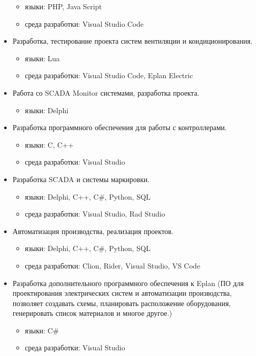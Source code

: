 \begin{itemize}
\begin{itemize}
       \item языки: PHP, Java Script
       \item среда разработки: Visual Studio Code
   \end{itemize}
   \item Разработка, тестирование проекта систем вентиляции и кондиционирования.
   \begin{itemize}
       \item языки: Lua
       \item среда разработки: Visual Studio Code, Eplan Electric
   \end{itemize}
   \item Работа со SCADA Monitor системами, разработка проекта.
   \begin{itemize}
       \item языки: Delphi
   \end{itemize}
   \item Разработка программного обеспечения для работы с контроллерами.
   \begin{itemize}
       \item языки: C, C++
       \item среда разработки: Visual Studio
   \end{itemize}
   \item Разработка SCADA и системы маркировки.
   \begin{itemize}
       \item языки: Delphi, C++, C#, Python, SQL
       \item среда разработки: Visual Studio, Rad Studio
   \end{itemize}
   \item Автоматизация производства, реализация проектов.
   \begin{itemize}
      \item языки: Delphi, C++, C#, Python, SQL
      \item среда разработки: Clion, Rider, Visual Studio, VS Code
  \end{itemize}
  \item  Разработка дополнительного программного обеспечения к Eplan (ПО для проектирования электрических систем и автоматизации производства, позволяет создавать схемы, планировать расположение оборудования, генерировать список материалов и многое другое.)
  \begin{itemize}
      \item языки: C\#
      \item среда разработки: Visual Studio

\end{itemize}
\end{itemize}
